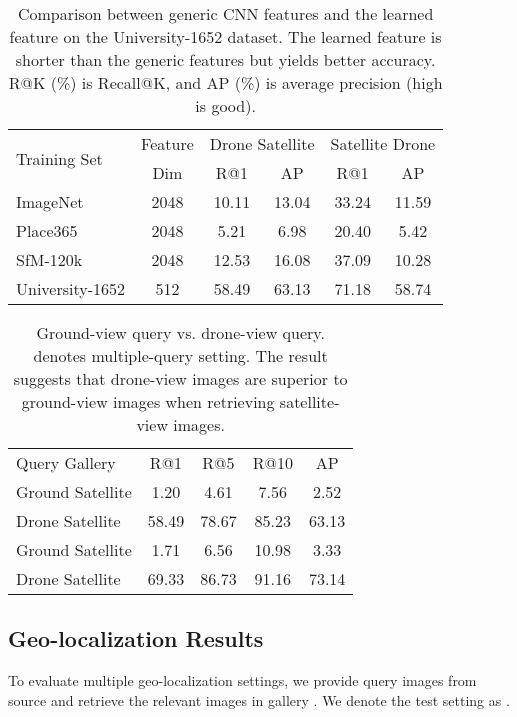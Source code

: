 \documentclass[sigconf]{acmart}
\begin{document}
\setlength{\tabcolsep}{5pt}
\begin{table}
\small
\begin{center}
\begin{tabular}{l|c|cc|cc}
\hline
\multirow{2}{*}{Training Set} & Feature & \multicolumn{2}{c|}{Drone  Satellite} & \multicolumn{2}{c}{Satellite  Drone}\\
  & Dim & R@1 & AP & R@1 & AP\\
\shline
ImageNet \cite{deng2009imagenet} & 2048 & 10.11 & 13.04 & 33.24 & 11.59 \\
Place365 \cite{zhou2017places} & 2048 & 5.21 & 6.98 & 20.40 & 5.42 \\
SfM-120k \cite{radenovic2018fine} & 2048 & 12.53 & 16.08 & 37.09 & 10.28 \\
University-1652 & 512 & 58.49 & 63.13 & 71.18 & 58.74 \\
\hline
\end{tabular}
\end{center}
\caption{ Comparison between generic CNN features and the learned feature on the University-1652 dataset. The learned feature is shorter than the generic features but yields better accuracy. R@K (\%) is Recall@K, and AP (\%) is average precision (high is good).}
\label{table:Generic}
\end{table}

\setlength{\tabcolsep}{7pt}
\begin{table}
\small
\begin{center}
\begin{tabular}{l|cccc}
\hline
Query  Gallery & R@1 & R@5 & R@10 & AP\\
\shline
Ground  Satellite & 1.20 & 4.61 & 7.56 & 2.52 \\
Drone  Satellite & 58.49 & 78.67 & 85.23 & 63.13\\
\hline
Ground  Satellite & 1.71 & 6.56 & 10.98 & 3.33 \\
Drone  Satellite & 69.33 & 86.73 & 91.16 & 73.14 \\
\hline
\end{tabular}
\end{center}
\caption{Ground-view query vs. drone-view query.  denotes multiple-query setting. The result suggests that drone-view images are superior to ground-view images when retrieving satellite-view images.}
\label{table:Street_vs_drone}
\end{table}

\subsection{Geo-localization Results} \label{sec:localization}
To evaluate multiple geo-localization settings, we provide query images from source  and retrieve the relevant images in gallery . We denote the test setting as .
\end{document}
